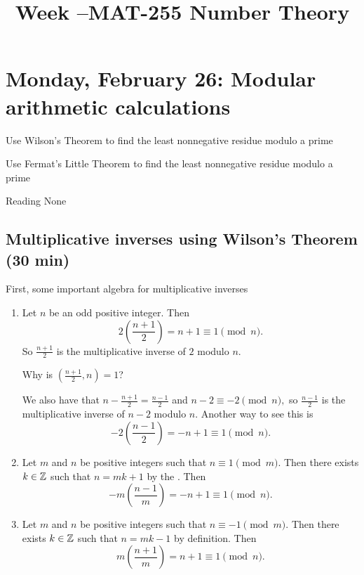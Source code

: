\documentclass[letterpaper, 11 pt]{ximera}
\title{Week \week--MAT-255 Number Theory}
\begin{document}
\section{Monday, February 26: Modular arithmetic calculations}

\begin{obj}
\item Use Wilson's Theorem to find the least nonnegative residue modulo a prime
\item Use Fermat's Little Theorem to find the least nonnegative residue modulo a prime
\end{obj}


\begin{pre}
    \item[Reading] None
\end{pre}

\subsection{Multiplicative inverses using Wilson's Theorem (30 min)}
First, some important algebra  for multiplicative inverses
\begin{example}
\begin{enumerate}
 \item  Let $n$ be an odd positive integer. Then \[2\left(\frac{n+1}{2}\right)=n+1\equiv 1\pmod{n}.\] So $\frac{n+1}{2}$ is the multiplicative inverse of $2$ modulo $n$. 
\begin{tps}
 Why is $\left(\frac{n+1}{2},n\right)=1$?
\end{tps}

We also have that $n-\frac{n+1}{2}= \frac{n-1}{2}$ and $n-2\equiv -2\pmod{n},$ so $\frac{n-1}{2}$ is the multiplicative inverse of $n-2$ modulo $n.$ Another way to see this is 
\[-2\left(\frac{n-1}{2}\right)=-n+1\equiv 1\pmod{n}.\] 

\item Let $m$ and $n$ be positive integers such that $n\equiv 1\pmod m.$ Then there exists $k\in\mathbb Z$ such that $n=mk+1$ by the . Then 
\[-m\left(\frac{n-1}{m}\right)=-n+1\equiv 1\pmod{n}.\]

\item Let $m$ and $n$ be positive integers such that $n\equiv -1\pmod m.$ Then there exists $k\in\mathbb Z$ such that $n=mk-1$ by definition. Then 
\[m\left(\frac{n+1}{m}\right)=n+1\equiv 1\pmod{n}.\]
\end{enumerate}

\end{example}
\end{document}
